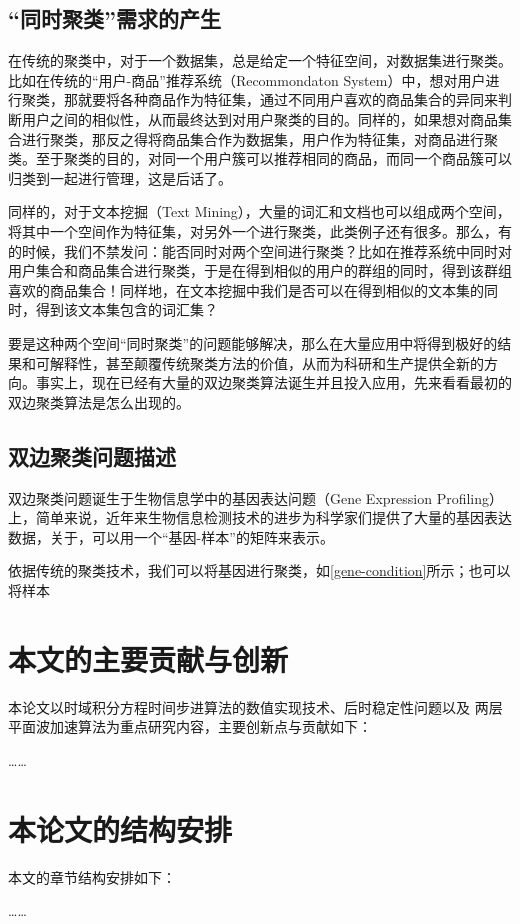 \subsection{“同时聚类”需求的产生}
在传统的聚类中，对于一个数据集，总是给定一个特征空间，对数据集进行聚类。比如在传统的“用户-商品”推荐系统（Recommondaton System）中，想对用户进行聚类，那就要将各种商品作为特征集，通过不同用户喜欢的商品集合的异同来判断用户之间的相似性，从而最终达到对用户聚类的目的。同样的，如果想对商品集合进行聚类，那反之得将商品集合作为数据集，用户作为特征集，对商品进行聚类。至于聚类的目的，对同一个用户簇可以推荐相同的商品，而同一个商品簇可以归类到一起进行管理，这是后话了。

同样的，对于文本挖掘（Text Mining），大量的词汇和文档也可以组成两个空间，将其中一个空间作为特征集，对另外一个进行聚类，此类例子还有很多。那么，有的时候，我们不禁发问：能否同时对两个空间进行聚类？比如在推荐系统中同时对用户集合和商品集合进行聚类，于是在得到相似的用户的群组的同时，得到该群组喜欢的商品集合！同样地，在文本挖掘中我们是否可以在得到相似的文本集的同时，得到该文本集包含的词汇集？

要是这种两个空间“同时聚类”的问题能够解决，那么在大量应用中将得到极好的结果和可解释性，甚至颠覆传统聚类方法的价值，从而为科研和生产提供全新的方向。事实上，现在已经有大量的双边聚类算法诞生并且投入应用，先来看看最初的双边聚类算法是怎么出现的。

\subsection{双边聚类问题描述}
双边聚类问题诞生于生物信息学中的基因表达问题（Gene Expression Profiling）上，简单来说，近年来生物信息检测技术的进步为科学家们提供了大量的基因表达数据，关于，可以用一个“基因-样本”的矩阵来表示。

依据传统的聚类技术，我们可以将基因进行聚类，如\ref{gene-condition}所示；也可以将样本



\section{本文的主要贡献与创新}
本论文以时域积分方程时间步进算法的数值实现技术、后时稳定性问题以及
两层平面波加速算法为重点研究内容，主要创新点与贡献如下：

……
\section{本论文的结构安排}
本文的章节结构安排如下：

……
